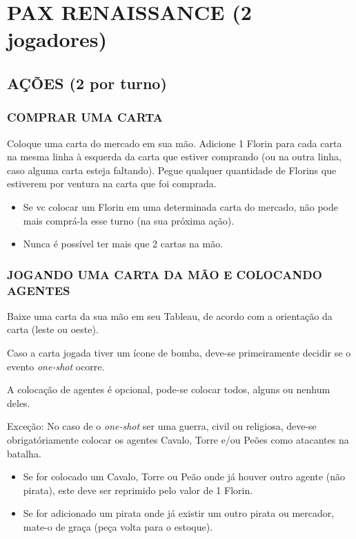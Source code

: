 \documentclass[11pt]{article}
\author{Fabio Favero Henkes}
\date{\today}
\title{}
\begin{document}
\tableofcontents

\section{PAX RENAISSANCE (2 jogadores)}
\label{sec:org5df7bc0}

\subsection{AÇÕES (2 por turno)}
\label{sec:orgc25efa2}

\subsubsection{COMPRAR UMA CARTA}
\label{sec:orgd9779e8}

Coloque uma carta do mercado em sua mão. Adicione 1 Florin para cada carta na mesma linha à esquerda da carta que estiver comprando (ou na outra linha, caso alguma carta esteja faltando).
Pegue qualquer quantidade de Florins que estiverem por ventura na carta que foi comprada.

\begin{itemize}
\item Se vc colocar um Florin em uma determinada carta do mercado, não pode mais comprá-la esse turno (na sua próxima ação).

\item Nunca é possível ter mais que 2 cartas na mão.
\end{itemize}

\subsubsection{JOGANDO UMA CARTA DA MÃO E COLOCANDO AGENTES}
\label{sec:org87a761c}

Baixe uma carta da sua mão em seu Tableau, de acordo com a orientação da carta (leste ou oeste).

Caso a carta jogada tiver um ícone de bomba, deve-se primeiramente decidir se o evento \emph{one-shot} ocorre.

A colocação de agentes é opcional, pode-se colocar todos, alguns ou nenhum deles.

Exceção: No caso de o \emph{one-shot} ser uma guerra, civil ou religiosa, deve-se obrigatóriamente colocar os agentes Cavalo, Torre e/ou Peões como atacantes na batalha.

\begin{itemize}
\item Se for colocado um Cavalo, Torre ou Peão onde já houver outro agente (não pirata), este deve ser reprimido pelo valor de 1 Florin.

\item Se for adicionado um pirata onde já existir um outro pirata ou mercador, mate-o de graça (peça volta para o estoque).
\end{itemize}
\end{document}
